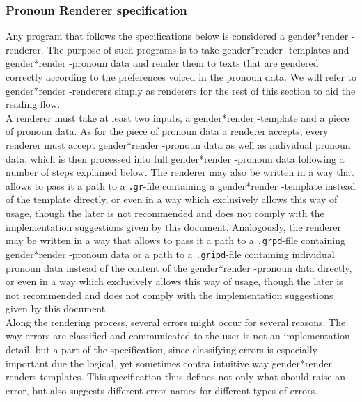 \documentclass{article}
\newcommand{\GenderRender}{
    gender*render
}
\begin{document}
    \subsubsection{Pronoun Renderer specification}

    Any program that follows the specifications below is considered a \GenderRender-renderer.
    The purpose of such programs is to take \GenderRender-templates and \GenderRender-pronoun data and render them to texts that are gendered correctly according to the preferences voiced in the pronoun data.
    We will refer to \GenderRender-renderers simply as renderers for the rest of this section to aid the reading flow.\\

    A renderer must take at least two inputs, a \GenderRender-template and a piece of pronoun data.
    As for the piece of pronoun data a renderer accepts, every renderer must accept \GenderRender-pronoun data as well as individual pronoun data, which is then processed into full \GenderRender-pronoun data following a number of steps explained below.
    The renderer may also be written in a way that allows to pass it a path to a \texttt{.gr}-file containing a \GenderRender-template instead of the template directly, or even in a way which exclusively allows this way of usage, though the later is not recommended and does not comply with the implementation suggestions given by this document.
    Analogously, the renderer may be written in a way that allows to pass it a path to a \texttt{.grpd}-file containing \GenderRender-pronoun data or a path to a \texttt{.gripd}-file containing individual pronoun data instead of the content of the \GenderRender-pronoun data directly, or even in a way which exclusively allows this way of usage, though the later is not recommended and does not comply with the implementation suggestions given by this document.\\

    Along the rendering process, several errors might occur for several reasons.
    The way errors are classified and communicated to the user is not an implementation detail, but a part of the specification, since classifying errors is especially important due the logical, yet sometimes contra intuitive way \GenderRender renders templates.
    This specification thus defines not only what should raise an error, but also suggests different error names for different types of errors.\\
\end{document}
